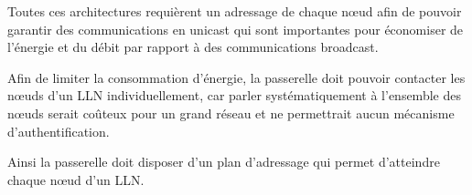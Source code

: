 Toutes ces architectures requièrent un adressage de chaque nœud afin de pouvoir garantir des communications en unicast qui sont importantes pour économiser de l'énergie et du débit par rapport à des communications broadcast.


Afin de limiter la consommation d'énergie, la passerelle doit pouvoir contacter les nœuds d'un \ac{LLN} individuellement, car parler systématiquement à l'ensemble des nœuds serait coûteux pour un grand réseau et ne permettrait aucun mécanisme d'authentification.

Ainsi la passerelle doit disposer d'un plan d'adressage qui permet d'atteindre chaque nœud d'un \ac{LLN}.

